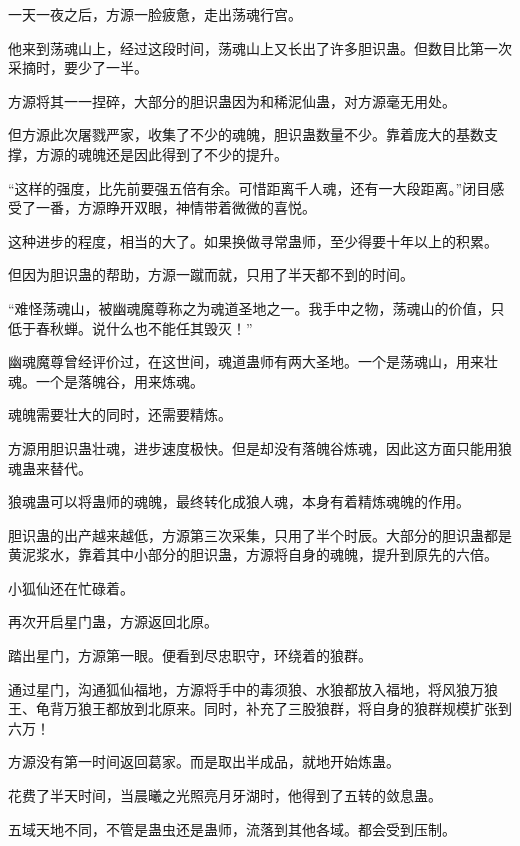 
\begin{this_body}

一天一夜之后，方源一脸疲惫，走出荡魂行宫。

他来到荡魂山上，经过这段时间，荡魂山上又长出了许多胆识蛊。但数目比第一次采摘时，要少了一半。

方源将其一一捏碎，大部分的胆识蛊因为和稀泥仙蛊，对方源毫无用处。

但方源此次屠戮严家，收集了不少的魂魄，胆识蛊数量不少。靠着庞大的基数支撑，方源的魂魄还是因此得到了不少的提升。

“这样的强度，比先前要强五倍有余。可惜距离千人魂，还有一大段距离。”闭目感受了一番，方源睁开双眼，神情带着微微的喜悦。

这种进步的程度，相当的大了。如果换做寻常蛊师，至少得要十年以上的积累。

但因为胆识蛊的帮助，方源一蹴而就，只用了半天都不到的时间。

“难怪荡魂山，被幽魂魔尊称之为魂道圣地之一。我手中之物，荡魂山的价值，只低于春秋蝉。说什么也不能任其毁灭！”

幽魂魔尊曾经评价过，在这世间，魂道蛊师有两大圣地。一个是荡魂山，用来壮魂。一个是落魄谷，用来炼魂。

魂魄需要壮大的同时，还需要精炼。

方源用胆识蛊壮魂，进步速度极快。但是却没有落魄谷炼魂，因此这方面只能用狼魂蛊来替代。

狼魂蛊可以将蛊师的魂魄，最终转化成狼人魂，本身有着精炼魂魄的作用。

胆识蛊的出产越来越低，方源第三次采集，只用了半个时辰。大部分的胆识蛊都是黄泥浆水，靠着其中小部分的胆识蛊，方源将自身的魂魄，提升到原先的六倍。

小狐仙还在忙碌着。

再次开启星门蛊，方源返回北原。

踏出星门，方源第一眼。便看到尽忠职守，环绕着的狼群。

通过星门，沟通狐仙福地，方源将手中的毒须狼、水狼都放入福地，将风狼万狼王、龟背万狼王都放到北原来。同时，补充了三股狼群，将自身的狼群规模扩张到六万！

方源没有第一时间返回葛家。而是取出半成品，就地开始炼蛊。

花费了半天时间，当晨曦之光照亮月牙湖时，他得到了五转的敛息蛊。

五域天地不同，不管是蛊虫还是蛊师，流落到其他各域。都会受到压制。


\end{this_body}
